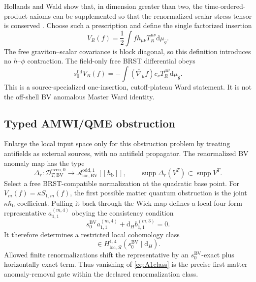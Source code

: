 \documentclass[11pt]{article}
\theoremstyle{definition}
\theoremstyle{remark}
\newcommand{\gbar}{\bar g}
\newcommand{\dd}{\mathrm d}
\newcommand{\supp}{\operatorname{supp}}
\newcommand{\cA}{\mathcal A}
\newcommand{\hbarLB}{\hbar_{\mathrm{b}}}
\begin{document}
Hollands and Wald show that, in dimension greater than two, the time-ordered-product
axioms can be supplemented so that the renormalized scalar stress tensor is conserved
\cite{HollandsWald2005}.  Choose such a prescription and define the single factorized
insertion
\begin{equation}
 V_R(f)=\frac12\int f h_{\mu\nu}T_R^{\mu\nu}\dd\mu_{\gbar}.
 \label{eq:VR}
\end{equation}
The free graviton--scalar covariance is block diagonal, so this definition introduces
no $h$--$\phi$ contraction.  The field-only free BRST differential obeys
\begin{equation}
 s_0^{\mathrm{fld}}V_R(f)
 =-\int(\bar\nabla_\mu f)c_\nu T_R^{\mu\nu}\dd\mu_{\gbar}.
 \label{eq:stressward}
\end{equation}
This is a source-specialized one-insertion, cutoff-plateau Ward statement.  It is not
the off-shell BV anomalous Master Ward identity.

\subsection{Typed AMWI/QME obstruction}

Enlarge the local input space only for this obstruction problem by treating antifields
as external sources, with no antifield propagator.  The renormalized BV anomaly map has
the type \cite{FredenhagenRejzner2013BV,BrunettiDuetschFredenhagenRejzner2022}
\begin{equation}
 \Delta_r:\mathcal D_{T,\mathrm{BV}}^{\mathrm{even},0}
 \longrightarrow
 \cA_{\mathrm{loc,BV}}^{\mathrm{odd},1}[[\hbarLB]],
 \qquad \supp\Delta_r(V^T)\subset\supp V^T.
 \label{eq:anomalymap}
\end{equation}
Select a free BRST-compatible normalization at the quadratic base point.  For
$V_m(f)=\kappa S_{1,m}(f)$, the first possible matter quantum obstruction is the joint
$\kappa\hbarLB$ coefficient.  Pulling it back through the Wick map defines a local
four-form representative $a_{1,1}^{(m,4)}$ obeying the consistency condition
\begin{equation}
 s_0^{\mathrm{BV}}a_{1,1}^{(m,4)}+\dd_Hb_{1,1}^{(m,3)}=0.
 \label{eq:localconsistency}
\end{equation}
It therefore determines a restricted local cohomology class
\begin{equation}
 [a_{1,1}^{(m,4)}]\in
 H^{1,4}_{\mathrm{loc},\mathcal R}(s_0^{\mathrm{BV}}\mid\dd_H).
 \label{eq:A1class}
\end{equation}
Allowed finite renormalizations shift the representative by an
$s_0^{\mathrm{BV}}$-exact plus horizontally exact term.  Thus vanishing of
\cref{eq:A1class} is the precise first matter anomaly-removal gate within the declared
renormalization class.
\end{document}
